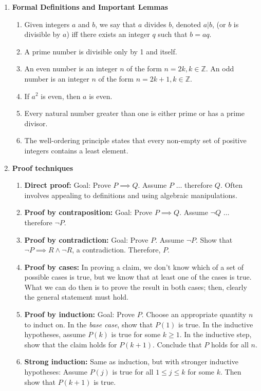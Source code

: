 \documentclass[10pt]{article}
\begin{document}
\begin{multicols}{2}
\begin{enumerate}
    \item \textbf{Formal Definitions and Important Lemmas}
    \begin{enumerate}
        \item Given integers $a$ and $b$, we say that $a$ divides $b$, denoted $a|b$, (or $b$ is divisible by $a$) iff there exists an integer $q$ such that $b = aq$.
        \item A prime number is divisible only by 1 and itself.
        \item An even number is an integer $n$ of the form $n=2k, k \in \mathbb{Z}$. An odd number is an integer $n$ of the form $n=2k+1, k \in \mathbb{Z}$.
        \item If $a^2$ is even, then $a$ is even.
        \item Every natural number greater than one is either prime or has a prime divisor.
        \item The well-ordering principle states that every non-empty set of positive integers contains a least element. 
    \end{enumerate}
    
    \item \textbf{Proof techniques}
    \begin{enumerate}
        \item \textbf{Direct proof:} Goal: Prove $P \implies Q$. Assume $P$ $\hdots$ therefore $Q$. Often involves appealing to definitions and using algebraic manipulations.
        \item \textbf{Proof by contraposition:} Goal: Prove $P \implies Q$. Assume $\neg Q$ $\hdots$ therefore $\neg P$.
        \item \textbf{Proof by contradiction:} Goal: Prove $P$. Assume $\neg P$. Show that $\neg P \implies R \land \neg R$, a contradiction. Therefore, $P$.
        \item \textbf{Proof by cases:} In proving a claim, we don’t know which of a set of possible cases is true, but we know that at least one of the cases is true. What we can do then is to prove the result in both cases; then, clearly the general statement must hold.
        \item \textbf{Proof by induction:} Goal: Prove $P$. Choose an appropriate quantity $n$ to induct on. In the \textit{base case}, show that $P(1)$ is true. In the inductive hypotheses, assume $P(k)$ is true for some $k \geq 1$. In the inductive step, show that the claim holds for $P(k+1)$. Conclude that $P$ holds for all $n$.
        \item \textbf{Strong induction:} Same as induction, but with stronger inductive hypotheses: Assume $P(j)$ is true for all $1 \leq j \leq k$ for some $k$. Then show that $P(k+1)$ is true.
    \end{enumerate}
    

\end{enumerate}
\end{multicols}
\end{document}
